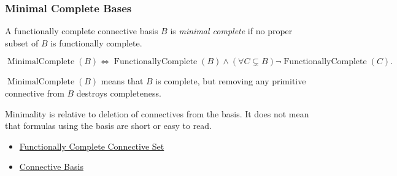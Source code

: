 \subsubsection*{Minimal Complete Bases}

\begin{tcolorbox}[colback=propbox, colframe=propborder, arc=2pt,
  left=6pt, right=6pt, top=4pt, bottom=4pt,
  title={\small\textbf{Definition (Minimal Complete Basis)}},
  fonttitle=\small\bfseries]
\begin{definition}
\label{def:minimal-complete-basis-propositional-logic}
A functionally complete connective basis \(B\) is \emph{minimal complete} if no
proper subset of \(B\) is functionally complete.
\end{definition}
\end{tcolorbox}

\begin{remark*}
\[
\operatorname{MinimalComplete}(B)
\Longleftrightarrow
\operatorname{FunctionallyComplete}(B)
\land
(\forall C\subsetneq B)\neg\operatorname{FunctionallyComplete}(C).
\]
\end{remark*}

\begin{remark*}
\(\operatorname{MinimalComplete}(B)\) means that \(B\) is complete, but removing
any primitive connective from \(B\) destroys completeness.
\end{remark*}

\begin{remark*}[Interpretation]
Minimality is relative to deletion of connectives from the basis. It does not
mean that formulas using the basis are short or easy to read.
\end{remark*}

\begin{dependencies}
\begin{itemize}
  \item \hyperref[def:functionally-complete-connective-set-propositional-logic]{Functionally Complete Connective Set}
  \item \hyperref[def:connective-basis-propositional-logic]{Connective Basis}
\end{itemize}
\end{dependencies}

